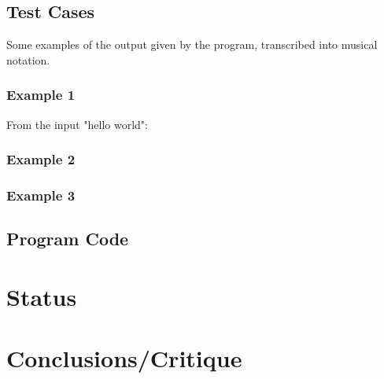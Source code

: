 \documentclass[runningheads,a4paper]{llncs}
\begin{document}
\subsection{Test Cases}

Some examples of the output given by the program, transcribed into musical
notation.

\subsubsection{Example 1}

From the input "hello world":


\subsubsection{Example 2}

\subsubsection{Example 3}

\subsection{Program Code}


\section{Status}
\section{Conclusions/Critique}
\end{document}
